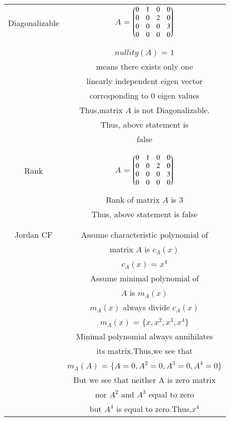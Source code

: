 \documentclass[journal,12pt,twocolumn]{IEEEtran}
\begin{document}
\begin{table}[h!]
\begin{center}
\begin{tabular}{|c|c|}
\hline
Diagonalizable & $A$ = $\begin{pmatrix}0&1&0&0\\
                0&0&2&0\\
                0&0&0&3\\
                0&0&0&0\end{pmatrix}$\\
& \\
& $nullity(A)$ = $1$ \\
& means there exists only one\\
& linearly independent eigen vector\\
& corresponding to $0$ eigen values\\
& Thus,matrix $A$ is not Diagonalizable.\\
& Thus, above statement is\\
& false \\
& \\
\hline
& \\
Rank & $A$ = $\begin{pmatrix}0&1&0&0\\
                0&0&2&0\\
                0&0&0&3\\
                0&0&0&0\end{pmatrix}$\\
& \\
& Rank of matrix $A$ is $3$\\
& Thus, above statement is false\\
& \\
\hline
& \\
Jordan CF & Assume characteristic polynomial of\\
& matrix $A$ is $c_A(x)$ \\
& $c_A(x)$ = $x^4$ \\
& Assume minimal polynomial of\\
& $A$ is $m_A(x)$\\
& $m_A(x)$ always divide $c_A(x)$ \\
& $m_A(x)$ = $\{x,x^2,x^3,x^4\}$\\
& Minimal polynomial always annihilates\\
& its matrix.Thus,we see that\\
& $m_A(A)$ = $\{A=0,A^2=0,A^3=0,A^4=0\}$\\
& But we see that neither A is zero matrix\\
& nor $A^2$ and $A^3$ equal to zero\\
& but $A^4$ is equal to zero.Thus,$x^4$\\

\end{tabular}
\end{center}
\end{table}
\end{document}
